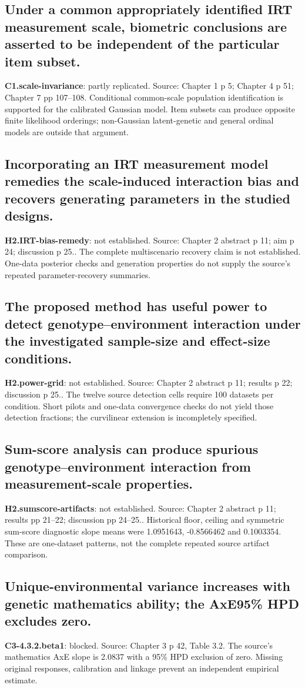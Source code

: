 \documentclass[11pt]{article}
\begin{document}
\subsection{Under a common appropriately identified IRT measurement scale, biometric conclusions are asserted to be independent of the particular item subset.}
\textbf{C1.scale-invariance}: partly replicated. Source: Chapter 1 p 5; Chapter 4 p 51; Chapter 7 pp 107--108. Conditional common-scale population identification is supported for the calibrated Gaussian model. Item subsets can produce opposite finite likelihood orderings; non-Gaussian latent-genetic and general ordinal models are outside that argument.
\subsection{Incorporating an IRT measurement model remedies the scale-induced interaction bias and recovers generating parameters in the studied designs.}
\textbf{H2.IRT-bias-remedy}: not established. Source: Chapter 2 abstract p 11; aim p 24; discussion p 25.. The complete multiscenario recovery claim is not established. One-data posterior checks and generation properties do not supply the source's repeated parameter-recovery summaries.
\subsection{The proposed method has useful power to detect genotype--environment interaction under the investigated sample-size and effect-size conditions.}
\textbf{H2.power-grid}: not established. Source: Chapter 2 abstract p 11; results p 22; discussion p 25.. The twelve source detection cells require 100 datasets per condition. Short pilots and one-data convergence checks do not yield those detection fractions; the curvilinear extension is incompletely specified.
\subsection{Sum-score analysis can produce spurious genotype--environment interaction from measurement-scale properties.}
\textbf{H2.sumscore-artifacts}: not established. Source: Chapter 2 abstract p 11; results pp 21--22; discussion pp 24--25.. Historical floor, ceiling and symmetric sum-score diagnostic slope means were 1.0951643, -0.8566462 and 0.1003354. These are one-dataset patterns, not the complete repeated source artifact comparison.
\subsection{Unique-environmental variance increases with genetic mathematics ability; the AxE95\% HPD excludes zero.}
\textbf{C3-4.3.2.beta1}: blocked. Source: Chapter 3 p 42, Table 3.2. The source's mathematics AxE slope is 2.0837 with a 95\% HPD exclusion of zero. Missing original responses, calibration and linkage prevent an independent empirical estimate.
\end{document}

